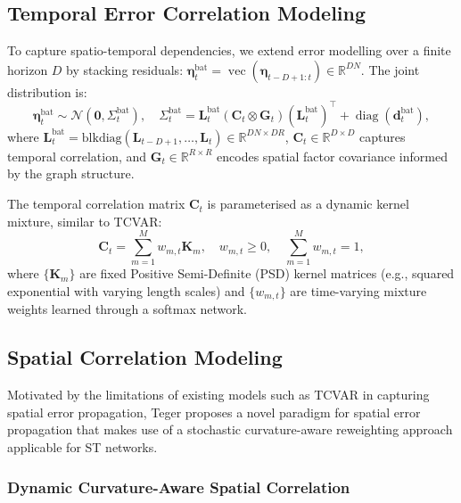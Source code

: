 \documentclass{article}
\theoremstyle{plain}
\theoremstyle{definition}
\theoremstyle{remark}
\newcommand{\R}{\mathbb{R}}
\newcommand{\diag}{\operatorname{diag}}
\renewcommand{\vec}{\operatorname{vec}}
\begin{document}
\subsection{Temporal Error Correlation Modeling}
\label{ssec:temporal}

To capture spatio-temporal dependencies, we extend error modelling over a
finite horizon $D$ by stacking residuals:
$\boldsymbol{\eta}_t^{\mathrm{bat}} = \vec(\boldsymbol{\eta}_{t-D+1:t}) \in
\R^{DN}$. The joint distribution is:
\begin{equation}
  \boldsymbol{\eta}_t^{\mathrm{bat}} \sim
  \mathcal{N}(\mathbf{0}, \Sigma_t^{\mathrm{bat}}),
  \quad
  \Sigma_t^{\mathrm{bat}} =
    \mathbf{L}_t^{\mathrm{bat}}
    (\mathbf{C}_t \otimes \mathbf{G}_t)
    (\mathbf{L}_t^{\mathrm{bat}})^\top
    + \diag(\mathbf{d}_t^{\mathrm{bat}}),
  \label{eq:batch-cov}
\end{equation}
where $\mathbf{L}_t^{\mathrm{bat}} = \mathrm{blkdiag}(\mathbf{L}_{t-D+1},
\ldots, \mathbf{L}_t) \in \R^{DN \times DR}$, $\mathbf{C}_t \in \R^{D \times D}$
captures temporal correlation, and $\mathbf{G}_t \in \R^{R \times R}$ encodes
spatial factor covariance informed by the graph structure.

The temporal correlation matrix $\mathbf{C}_t$ is parameterised as a dynamic
kernel mixture, similar to TCVAR:
\begin{equation}
  \mathbf{C}_t = \sum_{m=1}^M w_{m,t} \mathbf{K}_m,
  \quad w_{m,t} \ge 0,\quad \sum_{m=1}^M w_{m,t} = 1,
  \label{eq:kernel-mix}
\end{equation}
where $\{\mathbf{K}_m\}$ are fixed Positive Semi-Definite (PSD) kernel
matrices (e.g., squared exponential with varying length scales) and
$\{w_{m,t}\}$ are time-varying mixture weights learned through a softmax
network.

\subsection{Spatial Correlation Modeling}
\label{sec:spatial}

Motivated by the limitations of existing models such as TCVAR in capturing spatial error propagation, Teger proposes a novel paradigm for spatial error propagation that makes use of a stochastic curvature-aware reweighting 
approach applicable for ST networks.



\subsubsection{Dynamic Curvature-Aware Spatial Correlation}
\label{sssec:curvature}
\end{document}
